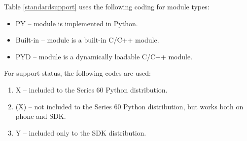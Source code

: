 Table \ref{standardsupport} uses the following coding for module types:

\begin{itemize}
\item PY -- module is implemented in Python.
\item Built-in -- module is a built-in C/C++ module.
\item PYD -- module is a dynamically loadable C/C++ module.
\end{itemize}
For support status, the following codes are used:

\begin{enumerate}
\item[\textbullet] X -- included to the Series 60 Python distribution.
\item[\textbullet] (X) -- not included to the Series 60 Python distribution, but works both on phone and SDK.
\item[\textbullet] Y -- included only to the SDK distribution.
\end{enumerate}
